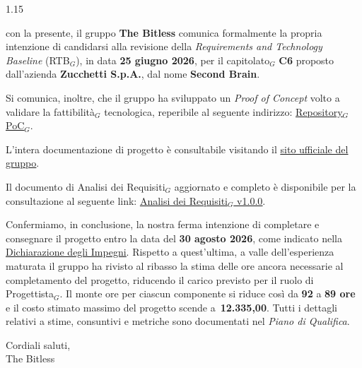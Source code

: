 \documentclass[a4paper, 11pt]{article}
\let\orighref\href
\renewcommand{\href}[2]{\orighref{#1}{\uline{#2}}}
\newcommand{\dataRTB}{\textbf{25 giugno 2026}}
\begin{document}
\vspace{0.4cm}
\begin{spacing}{1.15}

\noindent con la presente, il gruppo \textbf{The Bitless} comunica formalmente la propria intenzione di candidarsi alla revisione della \textit{Requirements and Technology Baseline} (RTB$_G$), in data \dataRTB, per il capitolato$_G$ \textbf{C6} proposto dall'azienda \textbf{Zucchetti S.p.A.}, dal nome \textbf{Second Brain}.

\vspace{0.2cm}

\noindent Si comunica, inoltre, che il gruppo ha sviluppato un \textit{Proof of Concept} volto a validare la fattibilità$_G$ tecnologica, reperibile al seguente indirizzo: \href{https://github.com/thebitless-group-swe/PoC}{Repository$_G$ PoC$_G$}.

\vspace{0.2cm}

\noindent L'intera documentazione di progetto è consultabile visitando il \href{https://thebitless.live}{sito ufficiale del gruppo}.

\vspace{0.2cm}

\noindent Il documento di Analisi dei Requisiti$_G$ aggiornato e completo è disponibile per la consultazione al seguente link: \href{https://thebitless.live/RTB/doc_esterna/analisi-dei-requisiti/analisi-dei-requisiti.pdf}{Analisi dei Requisiti$_G$ v1.0.0}.

\vspace{0.2cm}

\noindent Confermiamo, in conclusione, la nostra ferma intenzione di completare e consegnare il progetto entro la data del \textbf{30 agosto 2026}, come indicato nella \href{https://thebitless.live/candidatura/dichiarazione-degli-impegni/dichiarazione-degli-impegni.pdf}{Dichiarazione degli Impegni}. Rispetto a quest'ultima, a valle dell'esperienza maturata il gruppo ha rivisto al ribasso la stima delle ore ancora necessarie al completamento del progetto, riducendo il carico previsto per il ruolo di Progettista$_G$. Il monte ore per ciascun componente si riduce così da \textbf{92} a \textbf{89 ore} e il costo stimato massimo del progetto scende a \textbf{\texteuro\,12.335,00}. Tutti i dettagli relativi a stime, consuntivi e metriche sono documentati nel \textit{Piano di Qualifica}.

\vspace{0.8cm}

\noindent Cordiali saluti, \\
The Bitless

\end{spacing}
\end{document}
